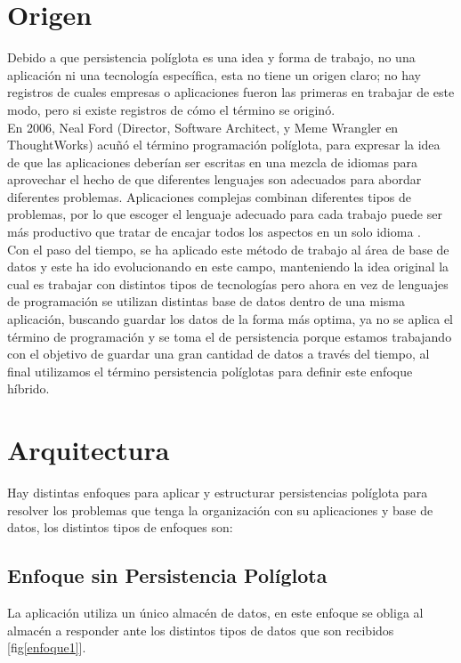 \documentclass[conference,compsoc]{IEEEtran}
\begin{document}
\section{Origen}
Debido a que persistencia políglota es una idea y forma de trabajo, no una aplicación ni una tecnología específica, esta no tiene un origen claro; no hay registros de cuales empresas  o aplicaciones fueron las primeras en trabajar de este modo, pero si existe registros de cómo el término  se originó. 
\\
En 2006, Neal Ford (Director, Software Architect, y Meme Wrangler en ThoughtWorks) \cite{art16} acuñó el  término programación políglota, para expresar la idea de que las aplicaciones deberían ser escritas en una mezcla de idiomas para aprovechar el hecho de que diferentes lenguajes son adecuados para abordar diferentes problemas. Aplicaciones complejas combinan diferentes tipos de problemas, por lo que escoger el lenguaje adecuado para cada trabajo puede ser más productivo que tratar de encajar todos los aspectos en un solo idioma \cite{art17}.
\\
Con el paso del tiempo, se ha aplicado este método de trabajo al área de base de datos y este ha ido evolucionando en este campo, manteniendo la idea original la cual es trabajar con distintos tipos de tecnologías pero ahora en vez de lenguajes de programación se utilizan distintas  base de datos dentro de una misma aplicación, buscando guardar los datos de la forma más optima, ya no se aplica el término de programación y se toma el de persistencia porque estamos trabajando con el objetivo de guardar una gran cantidad de datos a través del tiempo,  al final  utilizamos el término persistencia políglotas para definir este enfoque híbrido.
\\
\section{Arquitectura}
Hay distintas enfoques para aplicar y estructurar persistencias políglota para resolver los problemas que tenga la organización con su aplicaciones y base de datos, los distintos tipos de enfoques son:
\\
\subsection{Enfoque sin Persistencia Políglota}
La aplicación utiliza un único almacén de datos, en este enfoque se obliga al almacén a responder ante los distintos tipos de datos que son recibidos [fig\ref{enfoque1}].
\end{document}
